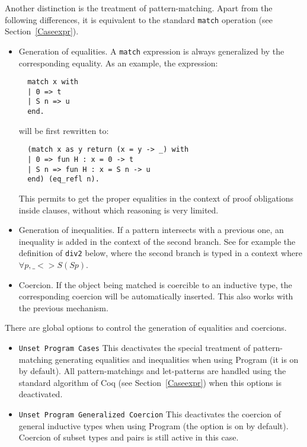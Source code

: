 Another distinction is the treatment of pattern-matching. Apart from the
following differences, it is equivalent to the standard {\tt match}
operation (see Section~\ref{Caseexpr}).
\begin{itemize}
\item Generation of equalities. A {\tt match} expression is always
  generalized by the corresponding equality. As an example,
  the expression: 

\begin{verbatim}
  match x with
  | 0 => t
  | S n => u
  end.
\end{verbatim}
will be first rewritten to:
\begin{verbatim}
  (match x as y return (x = y -> _) with
  | 0 => fun H : x = 0 -> t
  | S n => fun H : x = S n -> u
  end) (eq_refl n).
\end{verbatim}

  This permits to get the proper equalities in the context of proof
  obligations inside clauses, without which reasoning is very limited.

\item Generation of inequalities. If a pattern intersects with a
  previous one, an inequality is added in the context of the second
  branch. See for example the definition of {\tt div2} below, where the second
  branch is typed in a context where $\forall p, \_ <> S (S p)$.

\item Coercion. If the object being matched is coercible to an inductive
  type, the corresponding coercion will be automatically inserted. This also
  works with the previous mechanism.

\end{itemize}

There are global options to control the generation of equalities
and coercions.

\begin{itemize}
\item {\tt Unset Program Cases} This deactivates
  the special treatment of pattern-matching generating equalities and
  inequalities when using Program (it is on by default). All
  pattern-matchings and let-patterns are handled using the standard
  algorithm of Coq (see Section~\ref{Caseexpr}) when this options is
  deactivated.
\item {\tt Unset Program Generalized Coercion} This deactivates the coercion of general
  inductive types when using Program (the option is on by default).
  Coercion of subset types and pairs is still active in this case.
\end{itemize}

